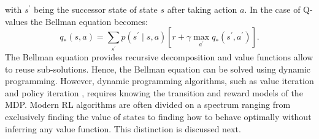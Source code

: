 \documentclass[\home/main.tex]{subfiles}
\begin{document}
with $s^{\prime}$ being the successor state of state $s$ after taking action $a$. In the case of Q-values the Bellman equation becomes:
\begin{equation}
	q_{*}(s, a)=\sum_{s^{\prime}} p\left(s^{\prime} \mid s, a\right)\left[r+\gamma \max _{a^{\prime}} q_{*}\left(s^{\prime}, a^{\prime}\right)\right].
\end{equation}
The Bellman equation provides recursive decomposition and value functions allow to reuse sub-solutions. Hence, the Bellman equation can be solved using dynamic programming. However, dynamic programming algorithms, such as value iteration and policy iteration \autocite{Sutton2018}, requires knowing the transition and reward models of the MDP. Modern RL algorithms are often divided on a spectrum ranging from exclusively finding the value of states to finding how to behave optimally without inferring any value function. This distinction is discussed next.
\end{document}
